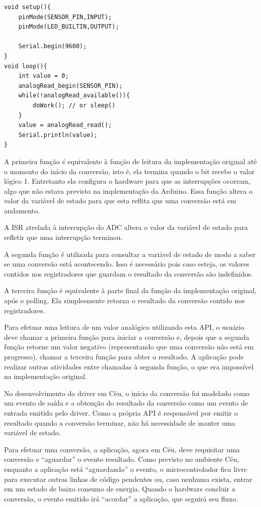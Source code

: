 \documentclass{article}
\begin{document}
\begin{lstlisting}[style=CStyle,label=analognonblockapp,caption=Aplicação utilizando driver não-bloqueante]
void setup(){
    pinMode(SENSOR_PIN,INPUT);
    pinMode(LED_BUILTIN,OUTPUT);

    Serial.begin(9600);
}
void loop(){
    int value = 0;
    analogRead_begin(SENSOR_PIN);
    while(!analogRead_available()){
        doWork(); // or sleep()
    }
    value = analogRead_read();
    Serial.println(value);
}
\end{lstlisting}
\par A primeira função é equivalente à função de leitura da implementação original até o momento do início da conversão, isto é, ela termina quando o bit recebe o valor lógico 1. Entretanto ela configura  o hardware para que as interrupções ocorram, algo que não estava previsto na implementação da Arduino. Essa função altera o valor da variável de estado para que esta reflita que uma conversão está em andamento.
\par A ISR atrelada à interrupção do ADC altera o valor da variável de estado para refletir que uma interrupção terminou.
\par A segunda função é utilizada para consultar a variável de estado de modo a saber se uma conversão está acontecendo. Isso é necessário pois caso esteja, os valores contidos nos registradores que guardam o resultado da conversão são indefinidos.
\par A terceira função é equivalente à parte final da função da implementação original, após o polling. Ela simplesmente retorna o resultado da conversão contido nos registradores.
\par Para efetuar uma leitura de um valor analógico utilizando esta API, o usuário deve chamar a primeira função para iniciar a conversão e, depois que a segunda função retorne um valor negativo (representando que uma conversão não está em progresso), chamar a terceira função para obter o resultado. A aplicação pode realizar outras atividades entre chamadas à segunda função, o que era impossível na implementação original.
\par No desenvolvimento do driver em Céu, o início da conversão foi modelado como um evento de saída e a obtenção do resultado da conversão como um evento de entrada emitido pelo driver. Como a própria API é responsável por emitir o resultado quando a conversão terminar, não há necessidade de manter uma variável de estado. 
\par Para efetuar uma conversão, a aplicação, agora em Céu, deve requisitar uma conversão e “aguardar” o evento resultado. Como previsto no ambiente Céu, enquanto a aplicação está “aguardando” o evento, o microcontrolador fica livre para executar outras linhas de código pendentes ou, caso nenhuma exista, entrar em um estado de baixo consumo de energia. Quando o hardware concluir a conversão, o evento emitido irá “acordar” a aplicação, que seguirá seu fluxo.
\end{document}
